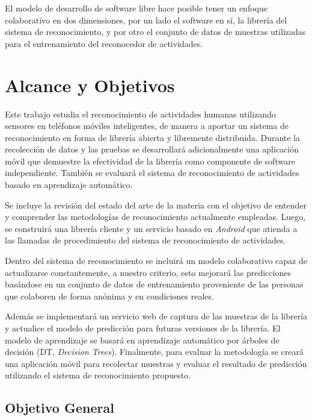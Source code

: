 El modelo de desarrollo de software libre hace posible tener un enfoque
colaborativo en dos dimensiones, por un lado el software en sí, la
librería del sistema de reconocimiento, y por otro el conjunto de
datos de muestras utilizadas para el entrenamiento del reconocedor
de actividades.

\section{Alcance y Objetivos}

\label{alcance-y-objetivos}

Este trabajo estudia el reconocimiento de actividades humanas utilizando
sensores en teléfonos móviles inteligentes, de manera a aportar un
sistema de reconocimiento en forma de librería abierta y libremente
distribuida. Durante la recolección de datos y las pruebas se desarrollará
adicionalmente una aplicación móvil que demuestre la efectividad de
la librería como componente de software independiente. También se
evaluará el sistema de reconocimiento de actividades basado en aprendizaje
automático.

Se incluye la revisión del estado del arte de la materia con el objetivo
de entender y comprender las metodologías de reconocimiento actualmente
empleadas. Luego, se construirá una librería cliente y un servicio
basado en \emph{Android} que atienda a las llamadas de procedimiento
del sistema de reconocimiento de actividades. 

Dentro del sistema de reconocimiento se incluirá un modelo colaborativo
capaz de actualizarse constantemente, a nuestro criterio, esto mejorará
las predicciones basándose en un conjunto de datos de entrenamiento
proveniente de las personas que colaboren de forma anónima y en condiciones
reales.

Además se implementará un servicio web de captura de las muestras
de la librería y actualice el modelo de predicción para futuras versiones
de la librería. El modelo de aprendizaje se basará en aprendizaje
automático por árboles de decisión (DT,
\emph{Decision Trees}). Finalmente, para evaluar la metodología se
creará una aplicación móvil para recolectar muestras y evaluar el
resultado de predicción utilizando el sistema de reconocimiento propuesto.

\subsection{Objetivo General}


